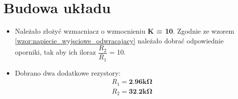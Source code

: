 \section{Budowa układu}
\begin{itemize}
    \item Należało złożyć wzmacniacz o wzmocnieniu \textbf{K = 10}. Zgodnie ze wzorem \ref{wzor:napiecie_wyjsciowe_odwracajacy} należało dobrać odpowiednie oporniki, tak aby ich iloraz $\dfrac{R_2}{R_1}$ = 10.
    \item Dobrano dwa dodatkowe rezystory:
        \begin{gather}
            \label{wzmacniacz:R1} R_1 = \textbf{2.96k}\boldsymbol{\Omega} \\
            \label{wzmacniacz:R2} R_2 = \textbf{32.2k}\boldsymbol{\Omega}
        \end{gather}
        
    \pagebreak
        

\end{itemize}
